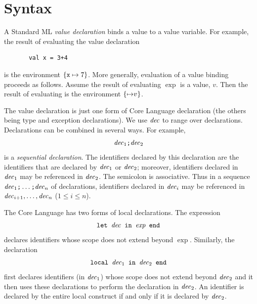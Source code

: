 \documentclass[12pt]{book}
\begin{document}
\section{Syntax}
A Standard ML  {\em value declaration} binds a value 
to a value variable. For example, the result of evaluating the value declaration
\begin{verbatim}
       val x = 3+4
\end{verbatim}
is the environment $\{\hbox{\tt x}\mapsto 7\}$. More generally,
evaluation of a value binding  proceeds
as follows. Assume the result of evaluating $\exp$ is a value, $v$.
Then the result of evaluating  is the
environment $\{{\it \mapsto} v\}$.

The value declaration is just one form of Core Language declaration 
(the others being type and exception declarations). We use ${\it dec}$ to
range over declarations. Declarations can be
combined in several ways. For example, 
$${\it dec}_1\hbox{\tt ;}{\it dec}_2$$
is a {\em sequential declaration}. The identifiers declared by this
declaration are the identifiers that are declared by ${\it dec}_1$ or ${\it dec}_2$;
moreover, identifiers declared in ${\it dec}_1$ may be referenced in ${\it dec}_2$.
The semicolon is associative. Thus in a sequence 
${\it dec}_1\hbox{\tt ;}\ldots\hbox{\tt ;}{\it dec}_n$
of declarations, identifiers declared in 
${\it dec}_i$ may be referenced in ${\it dec}_{i+1},\ldots
,{\it dec}_n$ ($1\leq i\leq n$). 

The Core Language has two forms of local declarations. The
expression 
$$\hbox{\tt let ${\it dec}$ in $\hbox{\it exp}$ end}$$
declares identifiers whose scope does not extend beyond $\exp$. Similarly,
the declaration
$$\hbox{\tt local ${\it dec}_1$ in ${\it dec}_2$ end}$$
first declares identifiers (in ${\it dec}_1$) whose scope does not extend beyond
${\it dec}_2$ and it then uses these declarations to perform the declaration in
${\it dec}_2$. An identifier is declared by the entire local construct if and only
if it is declared by ${\it dec}_2$.
\end{document}
